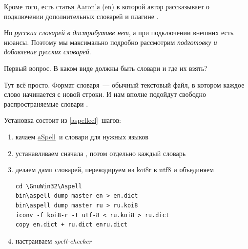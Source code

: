 Кроме того, есть
\href{http://www.102degrees.com/blog/2007/07/09/spell-checking-in-eclipse-pdt/}{статья
Aaron'а} (en) в которой автор рассказывает о подключении дополнительных словарей
и плагине .

Но \emph{русских словарей в дистрибутиве нет}, а при подключении внешних есть
нюансы. Поэтому мы максимально подробно рассмотрим \emph{подготовку и добавление
русских словарей}.

Первый вопрос. В каком виде должны быть словари и где их взять?

Тут всё просто. Формат словаря\ --- обычный текстовый файл, в котором каждое
слово начинается с новой строки. И нам вполне подойдут свободно распространяемые
словари .

Установка состоит из \ref{aspellecl}\ шагов:
\begin{enumerate}
  \item качаем \href{}{aSpell}\ и словари для нужных языков
  
  
  
  
  
  \item устанавливаем сначала , потом отдельно каждый словарь
  
  
  
  
  
  
  
  
  \item делаем дамп словарей, перекодируем из koi8r в utf8 и объединяем
  

\begin{lstlisting}
cd \GnuWin32\Aspell
bin\aspell dump master en > en.dict
bin\aspell dump master ru > ru.koi8
iconv -f koi8-r -t utf-8 < ru.koi8 > ru.dict
copy en.dict + ru.dict enru.dict
\end{lstlisting}
  
  \item \label{aspellecl} настраиваем \emph{spell-checker} \eclipse
  
  
  
  
  
\end{enumerate}

